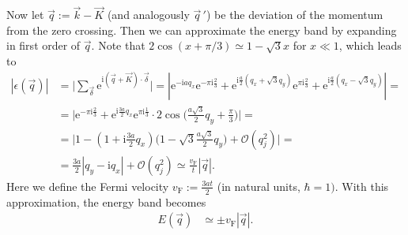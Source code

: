 \documentclass[english, parskip=full]{scrartcl}
\newcommand{\kla}{}
\newcommand{\klam}{}
\newcommand{\tecxt}{}
\renewcommand{\i}{\text{i}}
\newcommand{\e}{\text{e}}
\begin{document}
Now let $\vec{q}:=\vec{k}-\vec{K}$ (and analogously $\vec{q}\,'$) be the deviation of the momentum from the zero crossing.
Then we can approximate the energy band by expanding in first order of $\vec{q}$.
Note that $2\cos(x+\pi/3)\simeq 1-\sqrt{3}x$ for $x\ll 1$, which leads to
\begin{align}
\left\vert\epsilon(\vec{q})\right\vert&=\bigg\vert\sum_{\vec{\delta}}\e^{\i(\vec{q}+\vec{K})\cdot\vec{\delta}}\bigg\vert = \left\vert\e^{-\i aq_x}\e^{-\pi\i \frac{2}{3}}   + \e^{\i \frac{a}{2} (q_x+\sqrt{3}q_y)}\e^{\pi\i \frac{2}{3}} + \e^{\i \frac{a}{2} (q_x-\sqrt{3}q_y)}\right\vert=\\
&=\Big\vert \e^{-\pi\i \frac{2}{3}}+\e^{\i\frac{3a}{2}q_x}\e^{\pi\i \frac{1}{3}}\cdot 2\cos\kla\Big( \frac{a\sqrt{3}}{2}q_y + \frac{\pi}{3} \Big) \Big\vert=\\
&=\Big\vert 1-\kla\left( 1 + \i\frac{3a}{2}q_x \right)\Big( 1-\sqrt{3} \frac{a\sqrt{3}}{2}q_y \Big) + \mathcal{O}(q_j^2) \Big\vert=\\
&=\frac{3a}{2}\left\vert q_y-\i q_x \right\vert + \mathcal{O}(q_j^2)\simeq \frac{v_\tecxt\text{F}}{t}\left\vert\vec{q}\right\vert.
\end{align}
Here we define the Fermi velocity $v_\tecxt\text{F}:=\frac{3at}{2}$ (in natural units, $\hbar=1)$.
With this approximation, the energy band becomes
\begin{align}
E(\vec{q})&\simeq\pm v_\tecxt\text{F}\left\vert\vec{q}\right\vert.
\end{align}
\newpage
\end{document}
